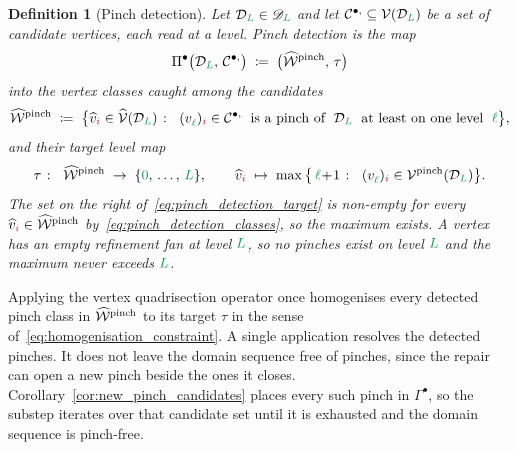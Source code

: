 \documentclass[a4paper, 12pt]{article}
\makeatletter
\newcommand{\detectV}{\Pi^{\bullet}}                             %
\newcommand{\collectV}{\Gamma^{\bullet}}                         %
\DeclareRobustCommand{\candV}[1][]{\mathcal{C}^{\bullet\ifx\@empty#1\@empty\else,#1\fi}}
\newcommand{\targetlevel}{\tau}                                 %
\newcommand{\green}{\color{ForestGreen}}
\newcommand{\brickred}{\color{BrickRed}}
\newcommand{\V}{\mathcal{V}}
\newcommand{\vertex}[2]{\freeQ{v}{}{#1}{#2}}
\newcommand{\vertexClass}[1]{\widehat{v}_{#1}}
\newcommand{\vertexClasses}{\widehat{\V}}
\DeclareRobustCommand{\markedVertexClasses}[1][]{\widehat{\mathcal{W}}\ifx\@empty#1\@empty\else^{#1}\fi}
\newcommand{\coarseIdxone}{{\brickred i}}
\renewcommand{\l}{{\green\ell}}
\renewcommand{\L}{{\green L}}
\newcommand{\lzero}{{\green 0}}
\newcommand{\freeQ}[4]{ ( {#1}^{#2}_{#3} )_{#4}}
\newtheorem{definition}[theorem]{Definition}
\theoremstyle{definition}
\theoremstyle{plain}
\numberwithin{equation}{section}
\DeclareRobustCommand{\domseq}[1][]{\mathcal{D}\ifx\@empty#1\@empty\else_{#1}\fi}
\newcommand{\alldomseqs}{\mathscr{D}}
\makeatother
\begin{document}
\begin{definition}[Pinch detection]
    \label{def:pinch_detection}
    Let $\domseq[\L] \in \alldomseqs_\L$ and let $\candV \subseteq \V(\domseq[\L])$ be a set of candidate vertices, each read at a level. \emph{Pinch detection} is the map
    \begin{equation}
        \label{eq:pinch_detection}
        \detectV \big( \domseq[\L], \, \candV \big) \; \coloneq \; \big( \markedVertexClasses[\mathrm{pinch}], \, \targetlevel \big)
    \end{equation}
    into the vertex classes caught among the candidates
    \begin{equation}
        \label{eq:pinch_detection_classes}
        \markedVertexClasses[\mathrm{pinch}] \; \coloneq \; \big\{ \vertexClass{\coarseIdxone} \in \vertexClasses(\domseq[\L]) \; \colon \;\; \vertex{\l}{\coarseIdxone} \in \candV \;\text{ is a pinch of }\; \domseq[\L] \;\text{ at least on one level }\; \l \big\},
    \end{equation}
    and their target level map
    \begin{equation}
        \label{eq:pinch_detection_target}
        \targetlevel \; \colon \;\; \markedVertexClasses[\mathrm{pinch}] \; \to \; \{ \lzero, \, \dots, \, \L \}, \qquad \vertexClass{\coarseIdxone} \; \mapsto \; \max \big\{ \, \l \! + \! 1 \; \colon \;\; \vertex{\l}{\coarseIdxone} \in \V^{\mathrm{pinch}}(\domseq[\L]) \big\} .
    \end{equation}
    The set on the right of~\eqref{eq:pinch_detection_target} is non-empty for every $\vertexClass{\coarseIdxone} \in \markedVertexClasses[\mathrm{pinch}]$ by~\eqref{eq:pinch_detection_classes}, so the maximum exists. A vertex has an empty refinement fan at level $\L$, so no pinches exist on level $\L$ and the maximum never exceeds $\L$.
\end{definition}

Applying the vertex quadrisection operator once homogenises every detected pinch class in $\markedVertexClasses[\mathrm{pinch}]$ to its target $\targetlevel$ in the sense of~\eqref{eq:homogenisation_constraint}. A single application resolves the detected pinches. It does not leave the domain sequence free of pinches, since the repair can open a new pinch beside the ones it closes. Corollary~\ref{cor:new_pinch_candidates} places every such pinch in $\collectV$, so the substep iterates over that candidate set until it is exhausted and the domain sequence is pinch-free.
\end{document}
